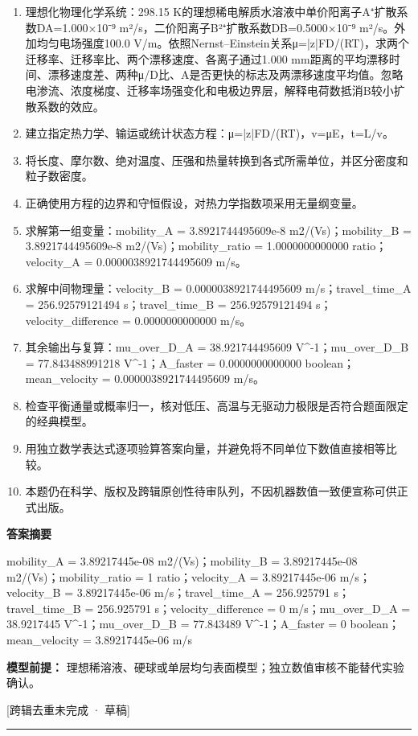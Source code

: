 \documentclass[UTF8,11pt,a4paper]{ctexart}
\begin{document}
\begin{enumerate}
\item 理想化物理化学系统：298.15 K的理想稀电解质水溶液中单价阳离子A⁺扩散系数DA=1.000×10⁻⁹ m²/s，二价阳离子B²⁺扩散系数DB=0.5000×10⁻⁹ m²/s。外加均匀电场强度100.0 V/m。依照Nernst–Einstein关系μ=|z|FD/(RT)，求两个迁移率、迁移率比、两个漂移速度、各离子通过1.000 mm距离的平均漂移时间、漂移速度差、两种μ/D比、A是否更快的标志及两漂移速度平均值。忽略电渗流、浓度梯度、迁移率场强变化和电极边界层，解释电荷数抵消B较小扩散系数的效应。
\item 建立指定热力学、输运或统计状态方程：μ=|z|FD/(RT)，v=μE，t=L/v。
\item 将长度、摩尔数、绝对温度、压强和热量转换到各式所需单位，并区分密度和粒子数密度。
\item 正确使用方程的边界和守恒假设，对热力学指数项采用无量纲变量。
\item 求解第一组变量：mobility\_A = 3.8921744495609e-8 m2/(Vs)；mobility\_B = 3.8921744495609e-8 m2/(Vs)；mobility\_ratio = 1.0000000000000 ratio；velocity\_A = 0.0000038921744495609 m/s。
\item 求解中间物理量：velocity\_B = 0.0000038921744495609 m/s；travel\_time\_A = 256.92579121494 s；travel\_time\_B = 256.92579121494 s；velocity\_difference = 0.0000000000000 m/s。
\item 其余输出与复算：mu\_over\_D\_A = 38.921744495609 V\textasciicircum{}-1；mu\_over\_D\_B = 77.843488991218 V\textasciicircum{}-1；A\_faster = 0.0000000000000 boolean；mean\_velocity = 0.0000038921744495609 m/s。
\item 检查平衡通量或概率归一，核对低压、高温与无驱动力极限是否符合题面限定的经典模型。
\item 用独立数学表达式逐项验算答案向量，并避免将不同单位下数值直接相等比较。
\item 本题仍在科学、版权及跨辑原创性待审队列，不因机器数值一致便宣称可供正式出版。
\end{enumerate}
\noindent\textbf{答案摘要}\par
mobility\_A = 3.89217445e-08 m2/(Vs)；mobility\_B = 3.89217445e-08 m2/(Vs)；mobility\_ratio = 1 ratio；velocity\_A = 3.89217445e-06 m/s；velocity\_B = 3.89217445e-06 m/s；travel\_time\_A = 256.925791 s；travel\_time\_B = 256.925791 s；velocity\_difference = 0 m/s；mu\_over\_D\_A = 38.9217445 V\textasciicircum{}-1；mu\_over\_D\_B = 77.843489 V\textasciicircum{}-1；A\_faster = 0 boolean；mean\_velocity = 3.89217445e-06 m/s\par
\noindent\textbf{模型前提：}
理想稀溶液、硬球或单层均匀表面模型；独立数值审核不能替代实验确认。\par
\noindent\textcolor{red!65!black}{[跨辑去重未完成 · 草稿]} \par
\medskip\hrule\medskip
{}
\end{document}
